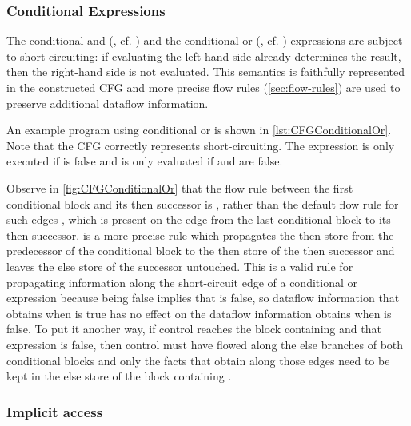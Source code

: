 
\subsubsection{Conditional Expressions}
\label{sec:cond-exp}

The conditional and (\code{&&}, cf. ) and the
conditional or (\code{||}, cf. ) expressions are subject
to short-circuiting: if evaluating the left-hand side already
determines the result, then the right-hand side is not evaluated. This
semantics is faithfully represented in the constructed CFG and more
precise flow rules (\autoref{sec:flow-rules}) are used to preserve
additional dataflow information.

An example program using conditional or is shown in
\autoref{lst:CFGConditionalOr}.  Note that the CFG correctly
represents short-circuiting.  The expression  is only
executed if  is false and  is only evaluated if
 and  are false.

Observe in \autoref{fig:CFGConditionalOr} that the flow rule between
the first conditional block and its then successor is
, rather than the default flow rule for such edges
, which is present on the edge from the last
conditional block to its then successor.   is a
more precise rule which propagates the then store from the predecessor
of the conditional block to the then store of the then successor and
leaves the else store of the successor untouched.  This is a valid
rule for propagating information along the short-circuit edge of a
conditional or expression because  being false
implies that  is false, so dataflow information that obtains
when  is true has no effect on the dataflow information
obtains when  is false.  To put it another way,
if control reaches the block containing  and
that expression is false, then control must have flowed along the else
branches of both conditional blocks and only the facts that obtain
along those edges need to be kept in the else store of the block
containing .



\subsubsection{Implicit  access}

